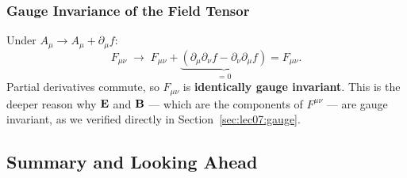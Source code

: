 \subsubsection*{Gauge Invariance of the Field Tensor}

Under $A_\mu \to A_\mu + \partial_\mu f$:
\begin{equation}\label{eq:lec07:F-gauge-inv}
    F_{\mu\nu} \;\to\; F_{\mu\nu}
    + \underbrace{(\partial_\mu\partial_\nu f - \partial_\nu\partial_\mu f)}_{= 0}
    = F_{\mu\nu} .
\end{equation}
Partial derivatives commute, so $F_{\mu\nu}$ is \textbf{identically gauge
invariant}.  This is the deeper reason why $\mathbf{E}$ and $\mathbf{B}$ — which are the
components of $F^{\mu\nu}$ — are gauge invariant, as we verified directly in
Section~\ref{sec:lec07:gauge}.

\subsection*{Summary and Looking Ahead}

